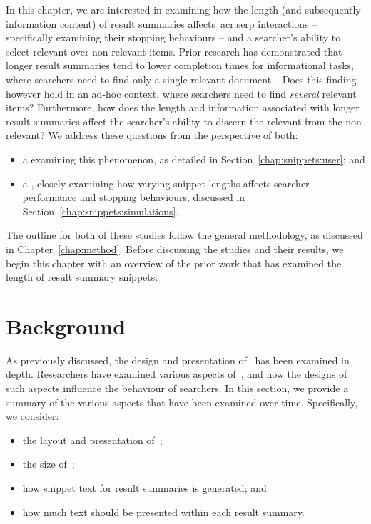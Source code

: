In this chapter, we are interested in examining how the length (and subsequently information content) of result summaries affects~\gls{acr:serp} interactions -- specifically examining their stopping behaviours -- and a searcher's ability to select relevant over non-relevant items. Prior research has demonstrated that longer result summaries tend to lower completion times for informational tasks, where searchers need to find only a single relevant document~\citep{cutrell2007eye_tracking}. Does this finding however hold in an ad-hoc context, where searchers need to find \emph{several} relevant items? Furthermore, how does the length and information associated with longer result summaries affect the searcher's ability to discern the relevant from the non-relevant? We address these questions from the perspective of both:

\begin{itemize}
    \item{a  examining this phenomenon, as detailed in Section~\ref{chap:snippets:user}; and}
    \item{a , closely examining how varying snippet lengths affects searcher performance and stopping behaviours, discussed in Section~\ref{chap:snippets:simulations}.}
\end{itemize}

The outline for both of these studies follow the general methodology, as discussed in Chapter~\ref{chap:method}. Before discussing the studies and their results, we begin this chapter with an overview of the prior work that has examined the length of result summary snippets.

\section{Background}\label{chap:snippets:background}
As previously discussed, the design and presentation of~ has been examined in depth. Researchers have examined various aspects of~, and how the designs of such aspects influence the behaviour of searchers. In this section, we provide a summary of the various aspects that have been examined over time. Specifically, we consider:

\begin{itemize}
    \item{the layout and presentation of~;}
    \item{the size of~;}
    \item{how snippet text for result summaries is generated; and}
    \item{how much text should be presented within each result summary}.
\end{itemize}

